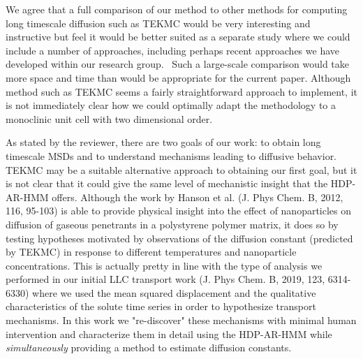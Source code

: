 \documentclass{article}
\begin{document}
\begin{enumerate}[label={Comment \theenumi :}, leftmargin=3.9\parindent]
    We agree that a full comparison of our method to other methods for computing long timescale 
    diffusion such as TEKMC would be very interesting and instructive but feel it would be better 
    suited as a separate study where we could include a number of approaches, including perhaps
    recent approaches we have developed within our research group.~\cite{coscia_capturing_2020}
    Such a large-scale comparison would take more space and time than would be appropriate for 
    the current paper. Although method such as TEKMC seems a fairly straightforward approach to
    implement, it is not immediately clear how we could optimally adapt the methodology to a 
    monoclinic unit cell with two dimensional order. 
    
    As stated by the reviewer, there are two goals of our work: to obtain long timescale MSDs and
    to understand mechanisms leading to diffusive behavior. TEKMC may be a suitable alternative 
    approach to obtaining our first goal, but it is not clear that it could give the same level
    of mechanistic insight that the HDP-AR-HMM offers. Although the work by Hanson et al.
    (J. Phys Chem. B, 2012, 116, 95-103) is able to provide physical insight into the effect of
    nanoparticles on diffusion of gaseous penetrants in a polystyrene polymer matrix, it does so
    by testing hypotheses motivated by observations of the diffusion constant (predicted by TEKMC)
    in response to different temperatures and nanoparticle concentrations. This is actually pretty
    in line with the type of analysis we performed in our initial LLC transport work (J. Phys Chem. B, 2019, 123, 6314-6330)
    where we used the mean squared displacement and the qualitative characteristics of the solute
    time series in order to hypothesize transport mechanisms. In this work we "re-discover" these
    mechanisms with minimal human intervention and characterize them in detail using the 
    HDP-AR-HMM while \textit{simultaneously} providing a method to estimate diffusion constants.
    

\end{enumerate}
\end{document}
